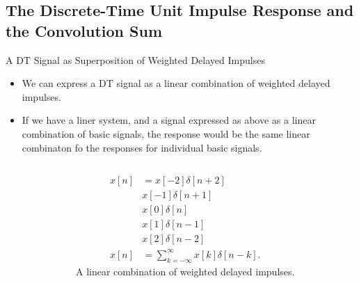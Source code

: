 \subsection{The Discrete-Time Unit Impulse Response and the Convolution Sum}

\begin{frame}{A DT Signal as  Superposition of Weighted Delayed Impulses}
    \begin{itemize}
      \item We can express a DT signal as a linear combination of weighted delayed impulses.
      \item If we have a liner system, and a signal expressed as above as a linear combination of basic signals, the response would be the same linear combinaton fo the responses for individual basic signals.
    \end{itemize}

\end{frame}


\begin{frame}[plain]
    {
        \begin{columns}
                \begin{figure}
                  \centering
                  
                  \caption{}\label{fi:dt_as_superposition}
                \end{figure}
            \pause
            \begin{align*}
              x[n] &= x[-2]\delta[n+2] \\
              &  x[-1]\delta[n+1] \\
              &  x[0]\delta[n] \\
              &  x[1]\delta[n-1] \\
              &  x[2]\delta[n-2] \\
              x[n] &= \sum_{k=-\infty}^{\infty}x[k]\delta[n-k].
            \end{align*}
            A linear combination of weighted delayed impulses.
        \end{columns}
    }
\end{frame}


